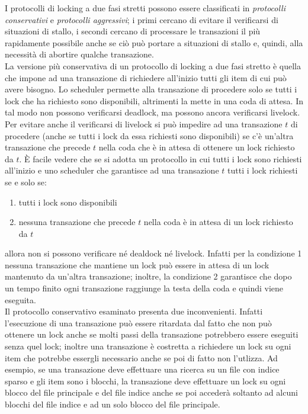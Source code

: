 I protocolli di locking a due fasi stretti possono essere classificati in \emph{protocolli conservativi} e
\emph{protocolli aggressivi}; i primi cercano di evitare il verificarsi di situazioni di stallo, i secondi cercano
di processare le transazioni il più rapidamente possibile anche se ciò può portare a situazioni di
stallo e, quindi, alla necessità di abortire qualche transazione.\\

La versione più conservativa di un protocollo di locking a due fasi stretto è quella che impone ad
una transazione di richiedere all'inizio tutti gli item di cui può avere bisogno. Lo scheduler permette
alla transazione di procedere solo se tutti i lock che ha richiesto sono disponibili, altrimenti la mette
in una coda di attesa. In tal modo non possono verificarsi deadlock, ma possono ancora verificarsi
livelock. Per evitare anche il verificarsi di livelock si può impedire ad una transazione $t$ di
procedere (anche se tutti i lock da essa richiesti sono disponibili) se c'è un'altra transazione che
precede $t$ nella coda che è in attesa di ottenere un lock richiesto da $t$. \`E facile vedere che se si
adotta un protocollo in cui tutti i lock sono richiesti all'inizio e uno scheduler che garantisce ad una
transazione $t$ tutti i lock richiesti se e solo se:
\begin{enumerate}
 \item tutti i lock sono disponibili
 \item nessuna transazione che precede $t$ nella coda è in attesa di un lock richiesto da $t$
\end{enumerate}
allora non si possono verificare né dealdock né livelock. Infatti per la condizione 1 nessuna
transazione che mantiene un lock può essere in attesa di un lock mantenuto da un'altra transazione;
inoltre, la condizione 2 garantisce che dopo un tempo finito ogni transazione raggiunge la testa della
coda e quindi viene eseguita.\\

Il protocollo conservativo esaminato presenta due inconvenienti. Infatti l'esecuzione di una
transazione può essere ritardata dal fatto che non può ottenere un lock anche se molti passi della
transazione potrebbero essere eseguiti senza quel lock; inoltre una transazione è costretta a
richiedere un lock su ogni item che potrebbe essergli necessario anche se poi di fatto non l'utlizza.
Ad esempio, se una transazione deve effettuare una ricerca su un file con indice sparso e gli item
sono i blocchi, la transazione deve effettuare un lock su ogni blocco del file principale e del file
indice anche se poi accederà soltanto ad alcuni blocchi del file indice e ad un solo blocco del file
principale.\\


